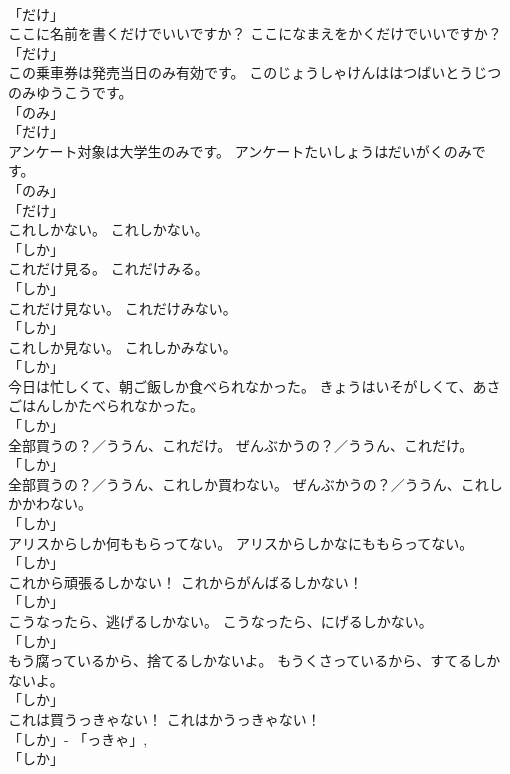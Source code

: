 \documentclass[8pt]{extreport}
\begin{document}
\begin{CJK}{UTF8}{min}
\\	「だけ」	
\\	ここに名前を書くだけでいいですか？	ここになまえをかくだけでいいですか？	
\\	「だけ」	
\\	この乗車券は発売当日のみ有効です。	このじょうしゃけんははつばいとうじつのみゆうこうです。	
\\	「のみ」 
\\	「だけ」	
\\	アンケート対象は大学生のみです。	アンケートたいしょうはだいがくのみです。	
\\	「のみ」 
\\	「だけ」	
\\	これしかない。	これしかない。	
\\	「しか」	
\\	これだけ見る。	これだけみる。	
\\	「しか」	
\\	これだけ見ない。	これだけみない。	
\\	「しか」	
\\	これしか見ない。	これしかみない。	
\\	「しか」	
\\	今日は忙しくて、朝ご飯しか食べられなかった。	きょうはいそがしくて、あさごはんしかたべられなかった。	
\\	「しか」	
\\	全部買うの？／ううん、これだけ。	ぜんぶかうの？／ううん、これだけ。	
\\	「しか」	
\\	全部買うの？／ううん、これしか買わない。	ぜんぶかうの？／ううん、これしかかわない。	
\\	「しか」	
\\	アリスからしか何ももらってない。	アリスからしかなにももらってない。	
\\	「しか」	
\\	これから頑張るしかない！	これからがんばるしかない！	
\\	「しか」	
\\	こうなったら、逃げるしかない。	こうなったら、にげるしかない。	
\\	「しか」	
\\	もう腐っているから、捨てるしかないよ。	もうくさっているから、すてるしかないよ。	
\\	「しか」	
\\	これは買うっきゃない！	これはかうっきゃない！	
\\	「しか」- 「っきゃ」, 
\\	「しか」	

\end{CJK}
\end{document}
